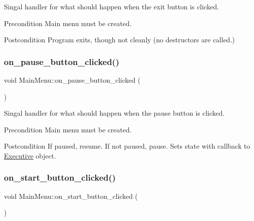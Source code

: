 Singal handler for what should happen when the exit button is clicked. 

\begin{DoxyPrecond}{Precondition}
Main menu must be created. 
\end{DoxyPrecond}
\begin{DoxyPostcond}{Postcondition}
Program exits, though not cleanly (no destructors are called.) 
\end{DoxyPostcond}
\mbox{\label{classMainMenu_a4c0bad31b1bbd49b3e8351ca137d4ac0}} 
\subsubsection{\texorpdfstring{on\_pause\_button\_clicked()}{on\_pause\_button\_clicked()}}
{\footnotesize\ttfamily void Main\+Menu\+::on\+\_\+pause\+\_\+button\+\_\+clicked (\begin{DoxyParamCaption}{ }\end{DoxyParamCaption})\hspace{0.3cm}{\ttfamily [protected]}}



Singal handler for what should happen when the pause button is clicked. 

\begin{DoxyPrecond}{Precondition}
Main menu must be created. 
\end{DoxyPrecond}
\begin{DoxyPostcond}{Postcondition}
If paused, resume. If not paused, pause. Sets state with callback to \mbox{\hyperlink{classExecutive}{Executive}} object. 
\end{DoxyPostcond}
\mbox{\label{classMainMenu_a49ada5047a5c54593462bf05ccf93c49}} 
\subsubsection{\texorpdfstring{on\_start\_button\_clicked()}{on\_start\_button\_clicked()}}
{\footnotesize\ttfamily void Main\+Menu\+::on\+\_\+start\+\_\+button\+\_\+clicked (\begin{DoxyParamCaption}{ }\end{DoxyParamCaption})\hspace{0.3cm}{\ttfamily [protected]}}



